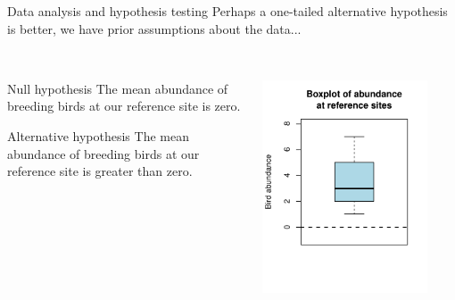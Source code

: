 \documentclass[xcolor=svgnames]{beamer}
\begin{document}
\begin{frame}[t]{Data analysis and hypothesis testing}
Perhaps a one-tailed alternative hypothesis is better, we have prior assumptions about the data...\\~\\
\begin{columns}
\begin{column}{0.5\textwidth}
\begin{block}{Null hypothesis}
The mean abundance of breeding birds at our reference site is zero.
\end{block}
\vspace{0.2in}
\begin{block}{Alternative hypothesis}
The mean abundance of breeding birds at our reference site is greater than zero.
\end{block}
\end{column}
\begin{column}{0.5\textwidth}
\centerline{\includegraphics[width=0.85\textwidth,trim=0in 0.8in 0in 0in]{R_for_data_analysis-hyp1.pdf}}
\end{column}
\end{columns}
\end{frame}
\end{document}
